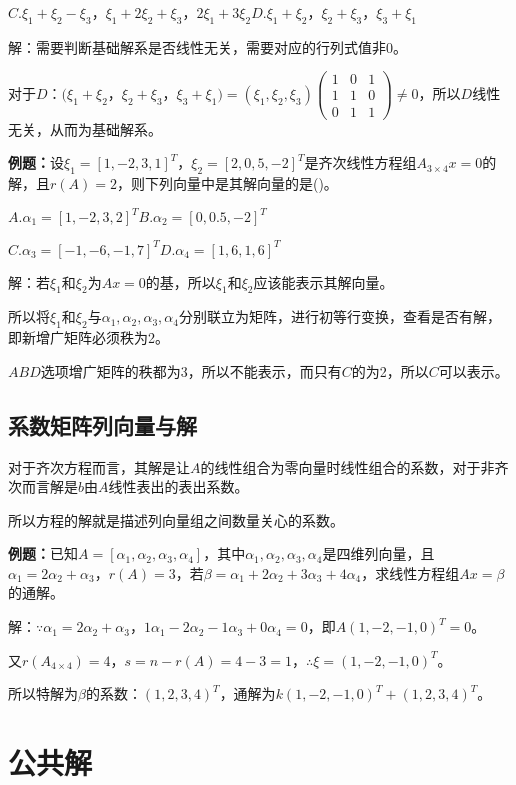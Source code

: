 \documentclass[UTF8, 12pt]{ctexart}
\begin{document}
$C.\xi_1+\xi_2-\xi_3$，$\xi_1+2\xi_2+\xi_3$，$2\xi_1+3\xi_2$\qquad$D.\xi_1+\xi_2$，$\xi_2+\xi_3$，$\xi_3+\xi_1$

解：需要判断基础解系是否线性无关，需要对应的行列式值非0。\medskip

对于$D$：$(\xi_1+\xi_2$，$\xi_2+\xi_3$，$\xi_3+\xi_1)=(\xi_1,\xi_2,\xi_3)\left(\begin{array}{ccc}
1 & 0 & 1 \\
1 & 1 & 0 \\
0 & 1 & 1
\end{array}\right)\neq0$，所以$D$线性无关，从而为基础解系。

\textbf{例题：}设$\xi_1=[1,-2,3,1]^T$，$\xi_2=[2,0,5,-2]^T$是齐次线性方程组$A_{3\times4}x=0$的解，且$r(A)=2$，则下列向量中是其解向量的是()。

$A.\alpha_1=[1,-2,3,2]^T$\qquad$B.\alpha_2=[0,0.5,-2]^T$

$C.\alpha_3=[-1,-6,-1,7]^T$\qquad$D.\alpha_4=[1,6,1,6]^T$

解：若$\xi_1$和$\xi_2$为$Ax=0$的基，所以$\xi_1$和$\xi_2$应该能表示其解向量。

所以将$\xi_1$和$\xi_2$与$\alpha_1,\alpha_2,\alpha_3,\alpha_4$分别联立为矩阵，进行初等行变换，查看是否有解，即新增广矩阵必须秩为2。

$ABD$选项增广矩阵的秩都为3，所以不能表示，而只有$C$的为2，所以$C$可以表示。

\subsection{系数矩阵列向量与解}

对于齐次方程而言，其解是让$A$的线性组合为零向量时线性组合的系数，对于非齐次而言解是$b$由$A$线性表出的表出系数。

所以方程的解就是描述列向量组之间数量关心的系数。

\textbf{例题：}已知$A=[\alpha_1,\alpha_2,\alpha_3,\alpha_4]$，其中$\alpha_1,\alpha_2,\alpha_3,\alpha_4$是四维列向量，且$\alpha_1=2\alpha_2+\alpha_3$，$r(A)=3$，若$\beta=\alpha_1+2\alpha_2+3\alpha_3+4\alpha_4$，求线性方程组$Ax=\beta$的通解。

解：$\because\alpha_1=2\alpha_2+\alpha_3$，$1\alpha_1-2\alpha_2-1\alpha_3+0\alpha_4=0$，即$A(1,-2,-1,0)^T=0$。

又$r(A_{4\times4})=4$，$s=n-r(A)=4-3=1$，$\therefore\xi=(1,-2,-1,0)^T$。

所以特解为$\beta$的系数：$(1,2,3,4)^T$，通解为$k(1,-2,-1,0)^T+(1,2,3,4)^T$。

\section{公共解}
\end{document}
